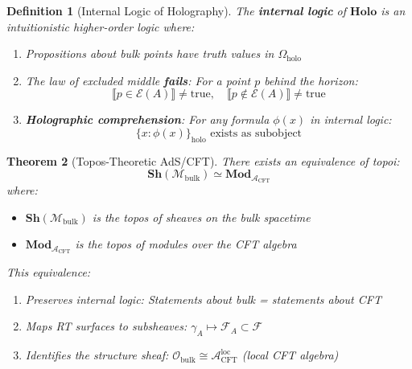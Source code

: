 \documentclass[12pt,a4paper]{article}
\newtheorem{theorem}{Theorem}[section]
\newtheorem{definition}[theorem]{Definition}
\begin{document}
\begin{definition}[Internal Logic of Holography]\label{def:internal-logic}
The \textbf{internal logic} of $\mathbf{Holo}$ is an intuitionistic higher-order logic where:
\begin{enumerate}
    \item Propositions about bulk points have truth values in $\Omega_{\text{holo}}$
    \item The law of excluded middle \textbf{fails}: For a point $p$ behind the horizon:
    \begin{equation}
    \llbracket p \in \mathcal{E}(A) \rrbracket \neq \text{true}, \quad \llbracket p \notin \mathcal{E}(A) \rrbracket \neq \text{true}
    \end{equation}
    \item \textbf{Holographic comprehension}: For any formula $\phi(x)$ in internal logic:
    \begin{equation}
    \{x : \phi(x)\}_{\text{holo}} \text{ exists as subobject}
    \end{equation}
\end{enumerate}
\end{definition}

\begin{theorem}[Topos-Theoretic AdS/CFT]\label{thm:topos-adscft}
There exists an equivalence of topoi:
\begin{equation}
\mathbf{Sh}(\mathcal{M}_{\text{bulk}}) \simeq \mathbf{Mod}_{\mathcal{A}_{\text{CFT}}}
\end{equation}
where:
\begin{itemize}
    \item $\mathbf{Sh}(\mathcal{M}_{\text{bulk}})$ is the topos of sheaves on the bulk spacetime
    \item $\mathbf{Mod}_{\mathcal{A}_{\text{CFT}}}$ is the topos of modules over the CFT algebra
\end{itemize}

This equivalence:
\begin{enumerate}
    \item Preserves internal logic: Statements about bulk = statements about CFT
    \item Maps RT surfaces to subsheaves: $\gamma_A \mapsto \mathcal{F}_A \subset \mathcal{F}$
    \item Identifies the structure sheaf: $\mathcal{O}_{\text{bulk}} \cong \mathcal{A}_{\text{CFT}}^{\text{loc}}$ (local CFT algebra)
\end{enumerate}
\end{theorem}
\end{document}

